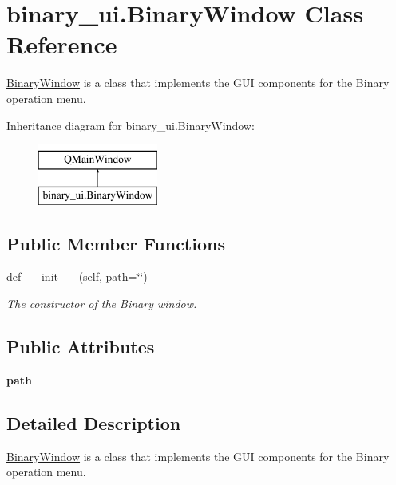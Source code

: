 \hypertarget{classbinary__ui_1_1_binary_window}{}\section{binary\+\_\+ui.\+Binary\+Window Class Reference}
\label{classbinary__ui_1_1_binary_window}


\hyperlink{classbinary__ui_1_1_binary_window}{Binary\+Window} is a class that implements the G\+UI components for the Binary operation menu.  


Inheritance diagram for binary\+\_\+ui.\+Binary\+Window\+:\begin{figure}[H]
\begin{center}
\leavevmode
\includegraphics[height=2.000000cm]{classbinary__ui_1_1_binary_window}
\end{center}
\end{figure}
\subsection*{Public Member Functions}
\begin{DoxyCompactItemize}
\item 
def \hyperlink{classbinary__ui_1_1_binary_window_a2bc9146b516f338d24aa00087b8736bf}{\+\_\+\+\_\+init\+\_\+\+\_\+} (self, path=\char`\"{}\char`\"{})
\begin{DoxyCompactList}\small\item\em The constructor of the Binary window. \end{DoxyCompactList}\end{DoxyCompactItemize}
\subsection*{Public Attributes}
\begin{DoxyCompactItemize}
\item 
\mbox{\label{classbinary__ui_1_1_binary_window_a503e75da778a99d49bb4e881104c51c8}} 
{\bfseries path}
\end{DoxyCompactItemize}


\subsection{Detailed Description}
\hyperlink{classbinary__ui_1_1_binary_window}{Binary\+Window} is a class that implements the G\+UI components for the Binary operation menu. 

